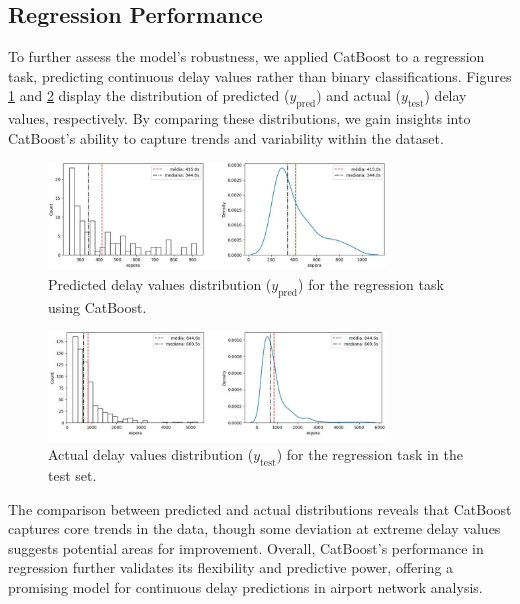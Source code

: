 \subsection{Regression Performance}

To further assess the model's robustness, we applied CatBoost to a regression task, predicting continuous delay values rather than binary classifications. Figures \ref{fig:y_pred} and \ref{fig:y_test} display the distribution of predicted ($y_\text{pred}$) and actual ($y_\text{test}$) delay values, respectively. By comparing these distributions, we gain insights into CatBoost’s ability to capture trends and variability within the dataset.

\begin{figure}[!htbp]
    \centering
    \includegraphics[width=0.8\textwidth]{img/regression_catboost_ypred.pdf}
    \caption{Predicted delay values distribution ($y_\text{pred}$) for the regression task using CatBoost.}
    \label{fig:y_pred}
\end{figure}

\begin{figure}[!htbp]
    \centering
    \includegraphics[width=0.8\textwidth]{img/regression_catboost_ytest.pdf}
    \caption{Actual delay values distribution ($y_\text{test}$) for the regression task in the test set.}
    \label{fig:y_test}
\end{figure}

The comparison between predicted and actual distributions reveals that CatBoost captures core trends in the data, though some deviation at extreme delay values suggests potential areas for improvement. Overall, CatBoost’s performance in regression further validates its flexibility and predictive power, offering a promising model for continuous delay predictions in airport network analysis.

